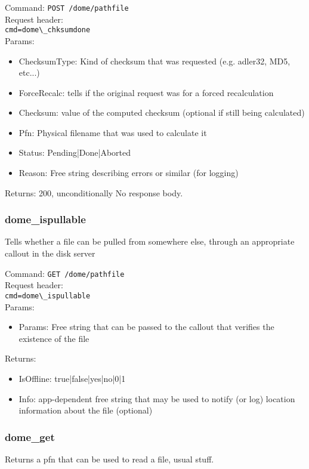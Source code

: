 \documentclass[a4paper,10pt]{scrreprt}
\begin{document}
Command:
\lstinline"POST /dome/pathfile"\\
Request header:\\
\lstinline"cmd=dome\_chksumdone"\\
Params:
\begin{itemize}
 \item ChecksumType: Kind of checksum that was requested (e.g. adler32, MD5, etc...)
 \item ForceRecalc: tells if the original request was for a forced recalculation
 \item Checksum: value of the computed checksum (optional if still being calculated)
 \item Pfn: Physical filename that was used to calculate it
 \item Status: Pending|Done|Aborted
 \item Reason: Free string describing errors or similar (for logging)
\end{itemize}

Returns: 200, unconditionally
No response body.

\subsubsection{dome\_ispullable}
Tells whether a file can be pulled from somewhere else, through an appropriate callout in the disk server

Command:
\lstinline"GET /dome/pathfile"\\
Request header:\\
\lstinline"cmd=dome\_ispullable"\\
Params:
\begin{itemize}
 \item Params: Free string that can be passed to the callout that verifies the existence of the file
\end{itemize}

Returns:
\begin{itemize}
 \item IsOffline: true|false|yes|no|0|1
 \item Info: app-dependent free string that may be used to notify (or log) location information about the file (optional)
\end{itemize}



\subsubsection{dome\_get}
Returns a pfn that can be used to read a file, usual stuff.\\
\end{document}
